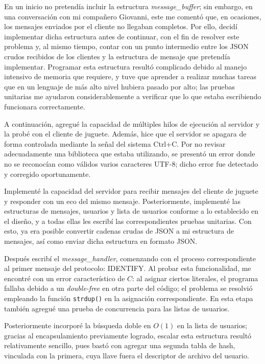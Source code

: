 \documentclass{article}
\begin{document}
    En un inicio no pretendía incluir la estructura \textit{message\_buffer}; sin embargo, en una conversación con mi compañero Giovanni, este me comentó que, en ocasiones, los mensajes enviados por el cliente no llegaban completos. Por ello, decidí implementar dicha estructura antes de continuar, con el fin de resolver este problema y, al mismo tiempo, contar con un punto intermedio entre los JSON crudos recibidos de los clientes y la estructura de mensaje que pretendía implementar. Programar esta estructura resultó complicado debido al manejo intensivo de memoria que requiere, y tuve que aprender a realizar muchas tareas que en un lenguaje de más alto nivel hubiera pasado por alto; las pruebas unitarias me ayudaron considerablemente a verificar que lo que estaba escribiendo funcionara correctamente.

    A continuación, agregué la capacidad de múltiples hilos de ejecución al servidor y la probé con el cliente de juguete. Además, hice que el servidor se apagara de forma controlada mediante la señal del sistema Ctrl+C. Por no revisar adecuadamente una biblioteca que estaba utilizando, se presentó un error donde no se reconocían como válidos varios caracteres UTF-8; dicho error fue detectado y corregido oportunamente.

    Implementé la capacidad del servidor para recibir mensajes del cliente de juguete y responder con un eco del mismo mensaje. Posteriormente, implementé las estructuras de mensajes, usuarios y lista de usuarios conforme a lo establecido en el diseño, y a todas ellas les escribí las correspondientes pruebas unitarias. Con esto, ya era posible convertir cadenas crudas de JSON a mi estructura de mensajes, así como enviar dicha estructura en formato JSON.

    Después escribí el \textit{message\_handler}, comenzando con el proceso correspondiente al primer mensaje del protocolo: IDENTIFY. Al probar esta funcionalidad, me encontré con un error característico de $C$: al asignar ciertos literales, el programa fallaba debido a un \textit{double-free} en otra parte del código; el problema se resolvió empleando la función \texttt{strdup()} en la asignación correspondiente. En esta etapa también agregué una prueba de concurrencia para las listas de usuarios.

    Posteriormente incorporé la búsqueda doble en $O(1)$ en la lista de usuarios; gracias al encapsulamiento previamente logrado, escalar esta estructura resultó relativamente sencillo, pues bastó con agregar una segunda tabla de hash, vinculada con la primera, cuya llave fuera el descriptor de archivo del usuario.
\end{document}
